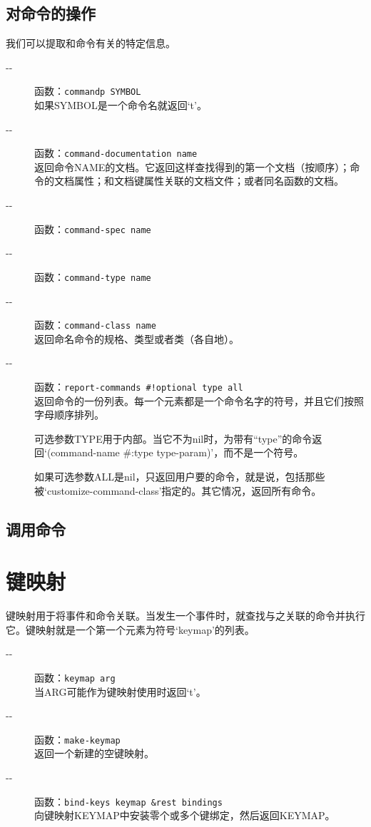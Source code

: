 \documentclass{book}
\begin{document}
\begin{CJK*}{UTF8}{gbsn}
\section{对命令的操作}
我们可以提取和命令有关的特定信息。
\begin{description}
\item[-{}-] 函数：\verb|commandp SYMBOL|\\
如果SYMBOL是一个命令名就返回`t'。
\item[-{}-] 函数：\verb|command-documentation name|\\
返回命令NAME的文档。它返回这样查找得到的第一个文档（按顺序）；命令的文档属性；和文档键属性关联的文档文件；或者同名函数的文档。
\item[-{}-] 函数：\verb|command-spec name|
\item[-{}-] 函数：\verb|command-type name|
\item[-{}-] 函数：\verb|command-class name|\\
返回命名命令的规格、类型或者类（各自地）。
\item[-{}-] 函数：\verb|report-commands #!optional type all|\\
返回命令的一份列表。每一个元素都是一个命令名字的符号，并且它们按照字母顺序排列。

可选参数TYPE用于内部。当它不为nil时，为带有``type''的命令返回`(command-name \#:type type-param)'，而不是一个符号。

如果可选参数ALL是nil，只返回用户要的命令，就是说，包括那些被`customize-command-class'指定的。其它情况，返回所有命令。
\end{description}
\section{调用命令}

\chapter{键映射}
键映射用于将事件和命令关联。当发生一个事件时，就查找与之关联的命令并执行它。键映射就是一个第一个元素为符号`keymap'的列表。
\begin{description}
\item[-{}-] 函数：\verb|keymap arg|\\
当ARG可能作为键映射使用时返回`t'。
\item[-{}-] 函数：\verb|make-keymap|\\
返回一个新建的空键映射。
\item[-{}-] 函数：\verb|bind-keys keymap &rest bindings|\\
向键映射KEYMAP中安装零个或多个键绑定，然后返回KEYMAP。


\end{description}
\end{CJK*}
\end{document}
